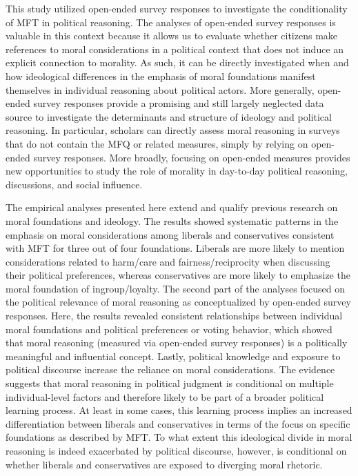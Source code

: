 \documentclass[12pt]{article}
\begin{document}
This study utilized open-ended survey responses to investigate the conditionality of MFT in political reasoning. The analyses of open-ended survey responses is valuable in this context because it allows us to evaluate whether citizens make references to moral considerations in a political context that does not induce an explicit connection to morality. As such, it can be directly investigated when and how ideological differences in the emphasis of moral foundations manifest themselves in individual reasoning about political actors. More generally, open-ended survey responses provide a promising and still largely neglected data source to investigate the determinants and structure of ideology and political reasoning. In particular, scholars can directly assess moral reasoning in surveys that do not contain the MFQ or related measures, simply by relying on open-ended survey responses. More broadly, focusing on open-ended measures provides new opportunities to study the role of morality in day-to-day political reasoning, discussions, and social influence.

The empirical analyses presented here extend and qualify previous research on moral foundations and ideology. The results showed systematic patterns in the emphasis on moral considerations among liberals and conservatives consistent with MFT for three out of four foundations. Liberals are more likely to mention considerations related to harm/care and fairness/reciprocity when discussing their political preferences, whereas conservatives are more likely to emphasize the moral foundation of ingroup/loyalty. The second part of the analyses focused on the political relevance of moral reasoning as conceptualized by open-ended survey responses. Here, the results revealed consistent relationships between individual moral foundations and political preferences or voting behavior, which showed that moral reasoning (measured via open-ended survey responses) is a politically meaningful and influential concept. Lastly, political knowledge and exposure to political discourse increase the reliance on moral considerations. The evidence suggests that moral reasoning in political judgment is conditional on multiple individual-level factors and therefore likely to be part of a broader political learning process. At least in some cases, this learning process implies an increased differentiation between liberals and conservatives in terms of the focus on specific foundations as described by MFT. To what extent this ideological divide in moral reasoning is indeed exacerbated by political discourse, however, is conditional on whether liberals and conservatives are exposed to diverging moral rhetoric.
\end{document}
